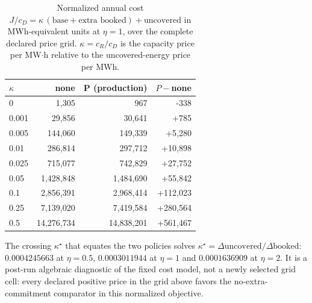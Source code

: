 \begin{table}[!tbp]
\centering
\caption{Normalized annual cost $J/c_D=\kappa\,(\text{base}+\text{extra booked})+\text{uncovered}$ in MWh-equivalent units at $\eta=1$, over the complete declared price grid. $\kappa=c_R/c_D$ is the capacity price per MW$\cdot$h relative to the uncovered-energy price per MWh.}
\label{tab:r2-cost}
\scriptsize
\setlength{\tabcolsep}{3pt}
\begin{tabular}{@{}lrrr@{}}
\toprule
$\kappa$ & none & P (production) & $P-$none \\
\midrule
0 & 1,305 & 967 & -338 \\
0.001 & 29,856 & 30,641 & +785 \\
0.005 & 144,060 & 149,339 & +5,280 \\
0.01 & 286,814 & 297,712 & +10,898 \\
0.025 & 715,077 & 742,829 & +27,752 \\
0.05 & 1,428,848 & 1,484,690 & +55,842 \\
0.1 & 2,856,391 & 2,968,414 & +112,023 \\
0.25 & 7,139,020 & 7,419,584 & +280,564 \\
0.5 & 14,276,734 & 14,838,201 & +561,467 \\
\bottomrule
\end{tabular}
\par\footnotesize The crossing $\kappa^\star$ that equates the two policies solves $\kappa^\star=\Delta\text{uncovered}/\Delta\text{booked}$: $0.0004245663$ at $\eta=0.5$, $0.0003011944$ at $\eta=1$ and $0.0001636909$ at $\eta=2$. It is a post-run algebraic diagnostic of the fixed cost model, not a newly selected grid cell: every declared positive price in the grid above favors the no-extra-commitment comparator in this normalized objective.
\end{table}

